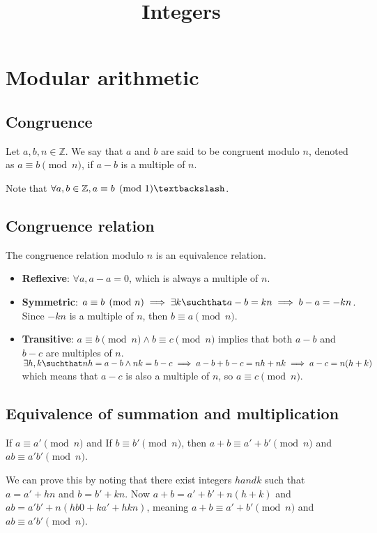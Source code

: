 \documentclass[preview]{standalone}
\begin{document}
\title{Integers}
\genpage

\section{Modular arithmetic}

\subsection{Congruence}

Let \(a,b,n\in\mathbb{Z}\).
We say that \(a\) and \(b\) are said to be congruent modulo \(n\),
denoted as \(a \equiv b \pmod{n}\), if \(a-b\) is a multiple of \(n\).

Note that \(\forall a,b \in \mathbb{Z}, a \equiv b \pmod{1}\textbackslash\).

\subsection{Congruence relation}

The congruence relation modulo \(n\) is an equivalence relation.

\begin{itemize}
    \item \textbf{Reflexive}: \(\forall a, a-a = 0\), which is always a multiple of \(n\).
    \item \textbf{Symmetric}: \(a \equiv b \pmod{n} \implies \exists k \suchthat a-b=kn \implies b-a=-kn\).
    Since \(-kn\) is a multiple of \(n\), then \(b \equiv a \pmod{n}\).
    \item \textbf{Transitive}: \(a \equiv b \pmod{n} \land b \equiv c \pmod{n}\) implies that both
    \(a-b\) and \(b - c\) are multiples of \(n\).
    \(\exists h, k \suchthat nh=a-b \land nk=b-c \implies a-b+b-c=nh+nk \implies a-c=n(h+k)\)
    which means that \(a-c\) is also a multiple of \(n\), so \(a \equiv c \pmod{n}\).
\end{itemize}

\subsection{Equivalence of summation and multiplication}

If \(a \equiv a' \pmod{n}\) and If \(b \equiv b' \pmod{n}\), then
\(a+b \equiv a' + b' \pmod{n}\) and \(ab \equiv a'b' \pmod{n}\).

We can prove this by noting that there exist integers \(h and k\) such that
\(a=a'+hn\) and \(b=b'+kn\).
Now \(a+b = a'+b'+n(h+k)\) and \(ab=a'b' + n(hb0+ka'+hkn)\), meaning
\(a+b \equiv a' + b' \pmod{n}\) and \(ab \equiv a'b' \pmod{n}\).
\end{document}
